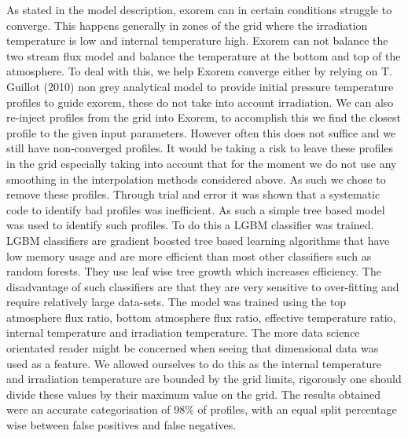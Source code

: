 As stated in the model description, exorem can in certain conditions struggle to converge. This happens generally in zones of the grid where the irradiation temperature is low and internal temperature high. Exorem can not balance the two stream flux model and balance the temperature at the bottom and top of the atmosphere. To deal with this, we help Exorem converge either by relying on T. Guillot (2010) \parencite{guillot_radiative_2010} non grey analytical model to provide initial pressure temperature profiles to guide exorem, these do not take into account irradiation. We can also re-inject profiles from the grid into Exorem, to accomplish this we find the closest profile to the given input parameters. However often this does not suffice and we still have non-converged profiles. It would be taking a risk to leave these profiles in the grid especially taking into account that for the moment we do not use any smoothing in the interpolation methods considered above. As such we chose to remove these profiles. Through trial and error it was shown that a systematic code to identify bad profiles was inefficient. As such a simple tree based model was used to identify such profiles. To do this a LGBM classifier was trained. LGBM classifiers are gradient boosted tree based learning algorithms that have low memory usage and are more efficient than most other classifiers such as random forests. They use leaf wise tree growth which increases efficiency. The disadvantage of such classifiers are that they are very sensitive to over-fitting and require relatively large data-sets. The model was trained using the top atmosphere flux ratio, bottom atmosphere flux ratio, effective temperature ratio, internal temperature and irradiation temperature. The more data science orientated reader might be concerned when seeing that dimensional data was used as a feature. We allowed ourselves to do this as the internal temperature and irradiation temperature are bounded by the grid limits, rigorously one should divide these values by their maximum value on the grid. The results obtained were an accurate categorisation of 98\% of profiles, with an equal split percentage wise between false positives and false negatives. 